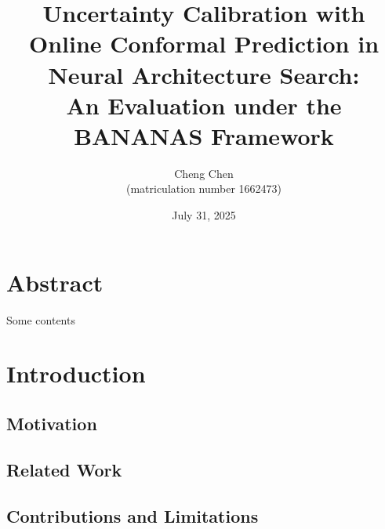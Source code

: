 \documentclass[a4paper,oneside,bibliography=totoc]{scrbook}
\begin{document}
\frontmatter \subject{Master Thesis} %
\title{\LARGE 
	Uncertainty Calibration with Online Conformal Prediction in Neural Architecture Search: \\ 
	An Evaluation under the BANANAS Framework 
}
\author{
	Cheng Chen\\ (matriculation number 1662473)} \date{July 31, 2025
}
\publishers{
	{\small Submitted to}\\
	Data and Web Science Group\\Prof.\ Dr.\ Margret Keuper\\University of Mannheim\\
}
\maketitle

\chapter{Abstract}
Some contents


\begingroup%
\hypersetup{hidelinks} %
\tableofcontents%
\endgroup


\listofalgorithms 
\listoffigures 
\listoftables


\mainmatter  %

\chapter{Introduction}
\label{ch:intro}

\section{Motivation}
\section{Related Work}
\section{Contributions and Limitations}
\end{document}
